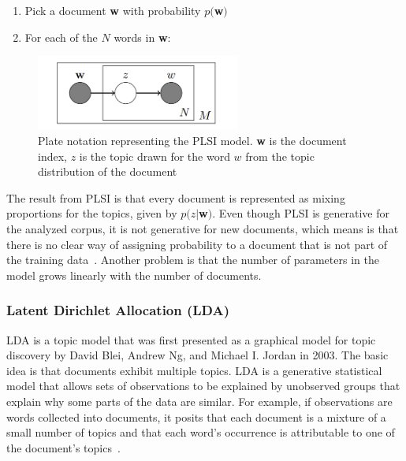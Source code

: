 \documentclass[12pt]{report}
\begin{document}
\begin{enumerate}
\item Pick a document \textbf{w} with probability $p($\textbf{w}$)$
\item For each of the $N$ words in \textbf{w}:
\end{enumerate}
\begin{center}
\begin{figure}[h]
\centering
\includegraphics[width=0.6\textwidth]{figs/PLSI_plate_notation.png}
\caption{Plate notation representing the PLSI model. \textbf{w} is the document 
index, $z$ is the topic drawn for the word $w$ from the topic distribution of 
the document}
\end{figure}
\end{center}
The result from PLSI is that every document is represented as mixing proportions
for the topics, given by $p(z|$\textbf{w}$)$. Even though PLSI is generative for 
the analyzed corpus, it is not generative for new documents, which means is that
there is no clear way of assigning probability to a document that is not part
of the training data~\cite{blei2003latent}. Another problem is that the number 
of parameters in the model grows linearly with the number of documents.


\subsubsection{Latent Dirichlet Allocation (LDA)}
\label{LDAexplained}
LDA is a topic model that was first presented as a graphical model for topic
discovery by David Blei, Andrew Ng, and Michael I. Jordan in 2003. The basic
idea is that documents exhibit multiple topics. LDA is a generative statistical
model that allows sets of observations to be explained by unobserved groups
that explain why some parts of the data are similar. For example, if
observations are words collected into documents, it posits that each document
is a mixture of a small number of topics and that each word's occurrence is
attributable to one of the document's topics~\cite{Blei11introductionto}.
\end{document}
